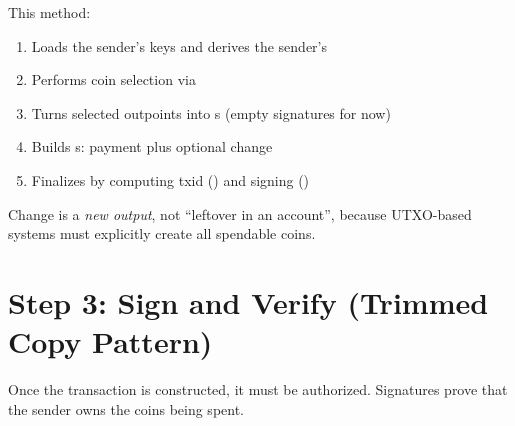 \begin{checkpointbox}
This method:
\begin{enumerate}
  \item Loads the sender's keys and derives the sender's 
  \item Performs coin selection via 
  \item Turns selected outpoints into s (empty signatures for now)
  \item Builds s: payment plus optional change
  \item Finalizes by computing txid () and signing ()
\end{enumerate}

Change is a \emph{new output}, not ``leftover in an account'', because UTXO-based systems must explicitly create all spendable coins.
\end{checkpointbox}

\section{Step 3: Sign and Verify (Trimmed Copy Pattern)}
\label{sec:ch09-5-step3}

Once the transaction is constructed, it must be authorized. Signatures prove that the sender owns the coins being spent.

